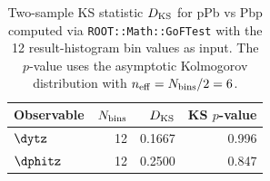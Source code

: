 \begin{table}[hbtp]
\centering
\begin{tabular}{|l|r|r|r|}
\hline
Observable & $N_{\rm bins}$ & $D_{\rm KS}$ & KS $p$-value \\
\hline
$\dytz$ & 12 & 0.1667 & 0.996 \\
$\dphitz$ & 12 & 0.2500 & 0.847 \\
\hline
\end{tabular}
\caption{Two-sample KS statistic $D_{\rm KS}$ for pPb vs Pbp computed via \texttt{ROOT::Math::GoFTest} with the 12 result-histogram bin values as input. The $p$-value uses the asymptotic Kolmogorov distribution with $n_{\rm eff} = N_{\rm bins}/2 = 6$.}
\label{table:combining_ks}
\end{table}
